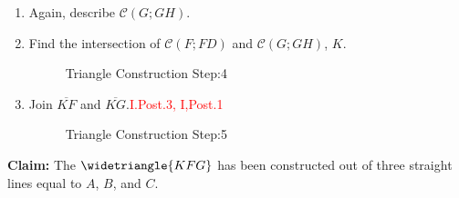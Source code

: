 \begin{con}
\begin{enumerate}
\item Again, describe $\mathscr{C}(G;GH)$. 

\item Find the intersection of $\mathscr{C}(F;FD)$ and $\mathscr{C}(G;GH)$,  $K$. 

\begin{figure}[H]
	\caption{Triangle Construction Step:4}
\end{figure}

\clearpage

\item Join $\overline{KF}$ and $\overline{KG}$.\hfill\textcolor{red}{I.Post.3, I,Post.1}

\begin{figure}[H]
	\caption{Triangle Construction Step:5}
\end{figure}

\end{enumerate}

\end{con}

\textbf{Claim:} The $\widetriangle{KFG}$ has been constructed out of three straight lines equal to $A$, $B$, and $C$.

